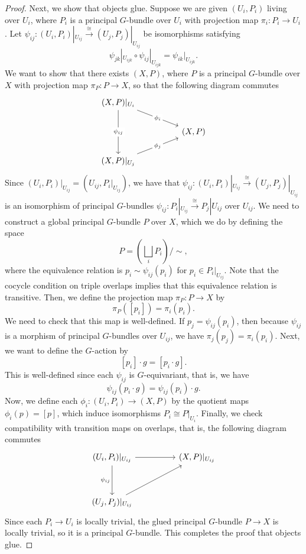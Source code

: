 \begin{proof}
    Next, we show that objects glue. Suppose we are given $(U_i, P_i)$ living over $U_i$, where $P_i$ is a principal $G$-bundle over $U_i$ with projection map $\pi_i:P_i\to U_i$. Let $\psi_{ij} : (U_i, P_i) |_{U_{ij}} \xrightarrow{\cong} (U_j, P_j) |_{U_{ij}}$ be isomorphisms satisfying
    $$
    \psi_{jk}|_{U_{ijk}}
    \circ
    \psi_{ij}|_{U_{ijk}}
    =
    \psi_{ik}|_{U_{ijk}}.
    $$
    We want to show that there exists $(X, P)$, where $P$ is a principal $G$-bundle over $X$ with projection map $\pi_P: P \to X$, so that the following diagram commutes
    \[\begin{tikzcd}
    	{(X, P)|_{U_i}} && \\
    	&& {(X, P)} \\
    	{(X, P)|_{U_j}}
    	\arrow["{{\phi_i}}"{description}, from=1-1, to=2-3]
    	\arrow["{{\psi_{ij}}}"{description}, from=1-1, to=3-1]
    	\arrow["{{\phi_j}}"{description}, from=3-1, to=2-3]
    \end{tikzcd}\]
    Since $(U_i, P_i) |_{U_{ij}} = (U_{ij}, P_i |_{U_{ij}})$, we have that $\psi_{ij} : (U_i, P_i) |_{U_{ij}} \xrightarrow{\cong} (U_j, P_j) |_{U_{ij}}$ is an isomorphism of principal $G$-bundles $\psi_{ij}: P_i |_{U_{ij}} \xrightarrow{\cong} P_j | U_{ij}$ over $U_{ij}$. We need to construct a global principal $G$-bundle $P$ over $X$, which we do by defining the space
    $$
    P = \left( \bigsqcup_i P_i \right) / \sim,
    $$
    where the equivalence relation is $p_i \sim \psi_{ij}(p_i)$ for $p_i \in P_i |_{U_{ij}}$. Note that the cocycle condition on triple overlaps implies that this equivalence relation is transitive. Then, we define the projection map $\pi_P: P \to X$ by 
    $$
    \pi_P([p_i]) = \pi_i(p_i).
    $$
    We need to check that this map is well-defined. If $p_j = \psi_{ij}(p_i)$, then because $\psi_{ij}$ is a morphism of principal $G$-bundles over $U_{ij}$, we have $\pi_j(p_j) = \pi_i(p_i)$. Next, we want to define the $G$-action by
    $$
    [p_i] \cdot g = [p_i \cdot g].
    $$
    This is well-defined since each $\psi_{ij}$ is $G$-equivariant, that is, we have
    $$
    \psi_{ij}(p_i \cdot g) = \psi_{ij}(p_i) \cdot g.
    $$
    Now, we define each $\phi_i: (U_i, P_i) \to (X, P)$ by the quotient maps $\phi_i(p) = [p]$, which induce isomorphisms $P_i \cong P |_{U_i}$. Finally, we check compatibility with transition maps on overlaps, that is, the following diagram commutes 
    \[\begin{tikzcd}
    	{(U_i,P_i)|_{U_{ij}}} && {(X,P)|_{U_{ij}}} \\
    	\\
    	{(U_j,P_j)|_{U_{ij}}}
    	\arrow[from=1-1, to=1-3]
    	\arrow["{\psi_{ij}}"', from=1-1, to=3-1]
    	\arrow[from=3-1, to=1-3]
    \end{tikzcd}\]
    Since each $P_i \to U_i$ is locally trivial, the glued principal $G$-bundle $P \to X$ is locally trivial, so it is a principal $G$-bundle. This completes the proof that objects glue.
\end{proof}

